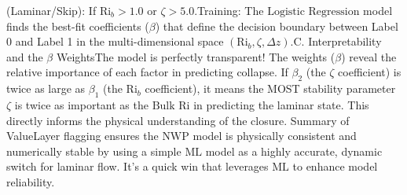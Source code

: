 (Laminar/Skip): If $\text{Ri}_b > 1.0$ or $\zeta > 5.0$.Training: The $\text{Logistic Regression}$ model finds the best-fit coefficients ($\beta$) that define the decision boundary between Label 0 and Label 1 in the multi-dimensional space $(\text{Ri}_b, \zeta, \Delta z)$.C. Interpretability and the $\beta$ WeightsThe model is perfectly transparent! The weights ($\beta$) reveal the relative importance of each factor in predicting collapse. If $\beta_2$ (the $\zeta$ coefficient) is twice as large as $\beta_1$ (the $\text{Ri}_b$ coefficient), it means the MOST stability parameter $\zeta$ is twice as important as the $\text{Bulk Ri}$ in predicting the laminar state. This directly informs the physical understanding of the closure. Summary of ValueLayer flagging ensures the $\text{NWP}$ model is physically consistent and numerically stable by using a simple $\text{ML}$ model as a highly accurate, dynamic switch for laminar flow. It's a quick win that leverages $\text{ML}$ to enhance model reliability.